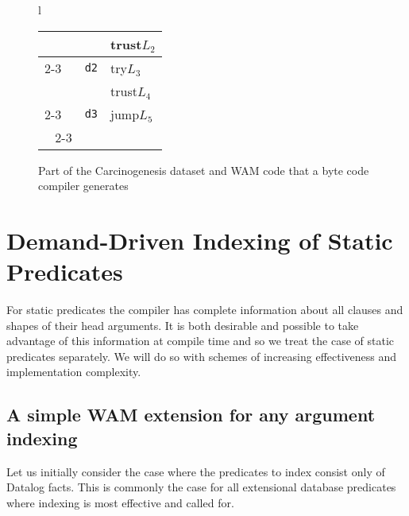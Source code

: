 \documentclass{llncs}
\newcommand{\wamcodesize}{scriptsize}
\newcommand{\code}[1]{\texttt{#1}}
\newcommand{\instr}[1]{\textsf{#1}}
\newcommand{\try}{\instr{try}\xspace}
\newcommand{\trust}{\instr{trust}\xspace}
\newcommand{\jump}{\instr{jump}\xspace}
\newcommand{\Cline}{\cline{2-3}}
\begin{document}
\begin{figure}[t]
{\begin{sf}
\begin{\wamcodesize}
\begin{tabular}[b]{l}
\begin{tabular}[b]{r|c@{\ }|l|}
	  \      &           & \trust $L_2$ \\ \Cline
          \      & \code{d2} & \try   $L_3$ \\
	  \      &           & \trust $L_4$ \\ \Cline
	  \      & \code{d3} & \jump  $L_5$ \\
	  \Cline
	\end{tabular}
      \end{tabular}
    \end{\wamcodesize}
  \end{sf}
}%
\caption{Part of the Carcinogenesis dataset and WAM code that a byte
  code compiler generates}
\label{fig:carc}
\end{figure}


\section{Demand-Driven Indexing of Static Predicates} \label{sec:static}
For static predicates the compiler has complete information about all
clauses and shapes of their head arguments. It is both desirable and
possible to take advantage of this information at compile time and so
we treat the case of static predicates separately.
%
We will do so with schemes of increasing effectiveness and
implementation complexity.

\subsection{A simple WAM extension for any argument indexing}
Let us initially consider the case where the predicates to index
consist only of Datalog facts. This is commonly the case for all
extensional database predicates where indexing is most effective and
called for.
\end{document}
